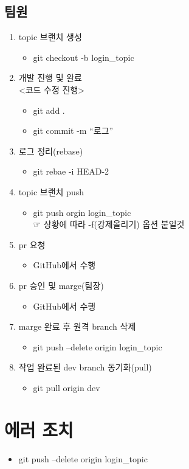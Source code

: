 \documentclass[12pt,a4paper]{oblivoir}
\begin{document}
\subsection{팀원}
\begin{enumerate}
\item topic 브랜치 생성 
\begin{itemize}
\item   git checkout -b login\_topic
\end{itemize}
\item 개발 진행 및 완료 \\ <코드 수정 진행>
\begin{itemize}
\item git add .
\item git commit -m ``로그''
\end{itemize}
\item 로그 정리(rebase)
\begin{itemize}
\item   git rebae -i HEAD-2
\end{itemize}
\item topic 브랜치 push
\begin{itemize}
\item git push orgin login\_topic \\  ☞ 상황에 따라 -f(강제올리기) 옵션 붙일것
\end{itemize}
\item pr 요청
\begin{itemize}
\item GitHub에서 수행
\end{itemize}
\item pr 승인 및 marge(팀장)
\begin{itemize}
\item GitHub에서 수행
\end{itemize}
\item marge 완료 후 원격 branch 삭제
\begin{itemize}
\item git push --delete origin login\_topic
\end{itemize}
\item 작업 완료된 dev branch 동기화(pull)
\begin{itemize}
\item git pull origin dev
\end{itemize}
\end{enumerate}

\section[에러 조치]{에러 조치}
\begin{itemize}
  \item git push --delete origin login\_topic
\end{itemize}
  
\end{document}
